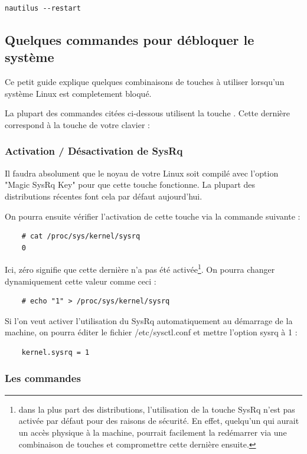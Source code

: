 \documentclass[a4paper,twoside]{article}
\begin{document}
\begin{verbatim}
nautilus --restart
\end{verbatim}

\subsection{Quelques commandes pour débloquer le système}
Ce petit guide explique quelques combinaisons de touches à utiliser lorsqu'un système Linux est completement bloqué.


La plupart des commandes citées ci-dessous utilisent la touche . Cette dernière correspond à la touche  de votre clavier :

\subsubsection{Activation / Désactivation de SysRq}

Il faudra absolument que le noyau de votre Linux soit compilé avec l'option "Magic SysRq Key" pour que cette touche fonctionne. La plupart des distributions récentes font cela par défaut aujourd'hui.

On pourra ensuite vérifier l'activation de cette touche via la commande suivante :
\begin{verbatim}
    # cat /proc/sys/kernel/sysrq
    0
\end{verbatim}

Ici, zéro signifie que cette dernière n'a pas été activée\footnote{dans la plus part des distributions, l'utilisation de la touche SysRq n'est pas activée par défaut pour des raisons de sécurité. En effet, quelqu'un qui aurait un accès physique à la machine, pourrait facilement la redémarrer via une combinaison de touches et compromettre cette dernière ensuite.}. On pourra changer dynamiquement cette valeur comme ceci :
\begin{verbatim}
    # echo "1" > /proc/sys/kernel/sysrq
\end{verbatim}

Si l'on veut activer l'utilisation du SysRq automatiquement au démarrage de la machine, on pourra éditer le fichier /etc/sysctl.conf et mettre l'option sysrq à 1 :
\begin{verbatim}
    kernel.sysrq = 1
\end{verbatim}

\subsubsection{Les commandes}
\end{document}
